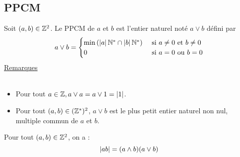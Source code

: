 \subsection{PPCM}
\begin{defi}
	Soit \((a, b) \in \mathbb{Z}^2\). Le PPCM de \(a\) et \(b\) est l’entier naturel noté \(a \vee b\) défini par
	\[a \vee b = \begin{cases}
			\min \left(\left\lvert a\right\rvert \mathbb{N}^* \cap \left\lvert b\right\rvert \mathbb{N}^*\right) & \text{ si } a\neq 0\text{ et }b \neq 0 \\
			0                                           & \text{ si } a = 0 \text{ ou } b = 0
		\end{cases}
	\]
	\underline{Remarques}\\~\\
	\begin{itemize}
		\item Pour tout \(a \in \mathbb{Z}, a \vee a = a \vee 1 = \left\lvert1\right\rvert\).
		\item Pour tout \((a, b) \in (\mathbb{Z}^*)^2\), \(a \vee b\) est le plus petit entier naturel non nul, multiple commun de \(a\) et \(b\).
	\end{itemize}
\end{defi}

\begin{prop}
	Pour tout \((a, b) \in \mathbb{Z}^2\), on a :
	\[\left\lvert ab\right\rvert = (a \wedge b) (a \vee b)\]
\end{prop}

